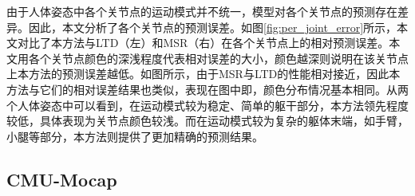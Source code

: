 由于人体姿态中各个关节点的运动模式并不统一，模型对各个关节点的预测存在差异。因此，本文分析了各个关节点的预测误差。如图\ref{fig:per_joint_error}所示，本文对比了本方法与LTD（左）和MSR（右）在各个关节点上的相对预测误差。本文用各个关节点颜色的深浅程度代表相对误差的大小，颜色越深则说明在该关节点上本方法的预测误差越低。如图所示，由于MSR与LTD的性能相对接近，因此本方法与它们的相对误差结果也类似，表现在图中即，颜色分布情况基本相同。从两个人体姿态中可以看到，在运动模式较为稳定、简单的躯干部分，本方法领先程度较低，具体表现为关节点颜色较浅。而在运动模式较为复杂的躯体末端，如手臂，小腿等部分，本方法则提供了更加精确的预测结果。


\subsection{CMU-Mocap}


